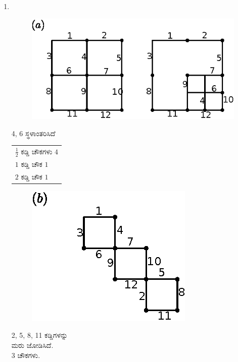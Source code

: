 \begin{enumerate}
\item 
~

\begin{minipage}[c]{5cm}
\begin{figure}[H]
\centering
\includegraphics{images/chap10/ans11a.eps}
\end{figure}
\end{minipage}
\qquad\qquad
\begin{minipage}[c]{4cm}
4, 6 ಸ್ಥಳಾಂತರಿಸಿದೆ

\begin{tabular}{l}
$\frac{1}{2}$ ಕಡ್ಡಿ ಚೌಕಗಳು $4$\\
$1$ ಕಡ್ಡಿ ಚೌಕ  $1$\\
$2$ ಕಡ್ಡಿ ಚೌಕ  $1$\\
\end{tabular}
\end{minipage}


\begin{minipage}[c]{4cm}
\begin{figure}[H]
\centering
\includegraphics{images/chap10/ans11b.eps}
\end{figure}
\end{minipage}
\begin{minipage}[c]{5cm}
2, 5, 8, 11 ಕಡ್ಡಿಗಳನ್ನು \\
ಮರು ಜೋಡಿಸಿದೆ. \\
3 ಚೌಕಗಳು. 
\end{minipage}


\end{enumerate}
